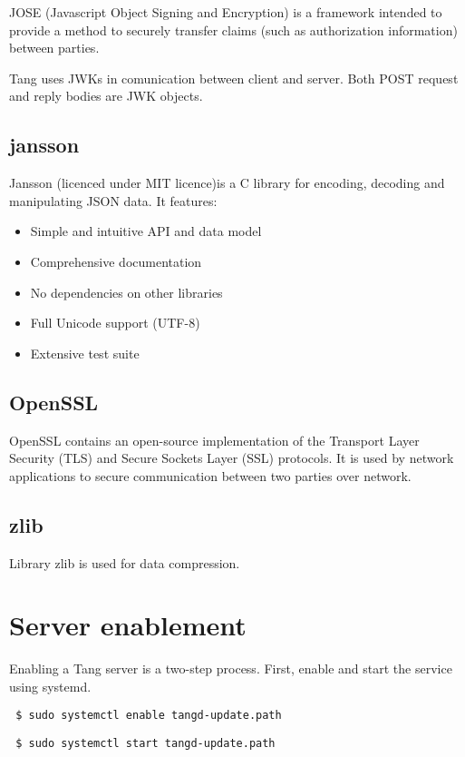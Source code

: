 \documentclass[../xdudla00-porting-Tang-to-Open-WRT.tex]{subfiles}
\begin{document}
JOSE (Javascript Object Signing and Encryption) is a framework intended to provide a method to securely transfer claims (such as authorization information) between parties.

Tang uses JWKs in comunication between client and server. Both POST request and reply bodies are JWK objects.

\subsection{jansson}\label{jansson}
Jansson \cite{jansson}(licenced under MIT \cite{mit} licence)is a C library for encoding, decoding and manipulating JSON data. It features:
\begin{itemize}

    \item Simple and intuitive API and data model
    \item Comprehensive documentation
    \item No dependencies on other libraries
    \item Full Unicode support (UTF-8)
    \item Extensive test suite
\end{itemize}

\subsection{OpenSSL}\label{openssl}
OpenSSL \cite{openssl} contains an open-source implementation of the Transport Layer Security (TLS) and Secure Sockets Layer (SSL) protocols.
It is used by network applications to secure communication between two parties over network.

\subsection{zlib}\label{zlib}
Library zlib \cite{zlib} is used for data compression.

\section{Server enablement}
Enabling a Tang server is a two-step process.
First, enable and start the service using systemd.

{\tt\begin{verbatim} $ sudo systemctl enable tangd-update.path\end{verbatim}
}

{\tt\begin{verbatim} $ sudo systemctl start tangd-update.path\end{verbatim}
}
\end{document}
